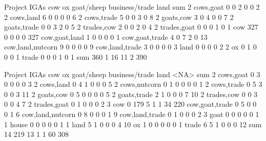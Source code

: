 \begin{Schunk}
\begin{Soutput}
                  Project
IGAs               cow  ox goat/sheep business/trade land sum
  2 cows,goat        0   0          2              0    0   2
  2 cows,land        6   0          0              0    0   6
  2 cows,trade       5   0          0              3    0   8
  2 goats,cow        3   0          4              0    0   7
  2 goats,trade      0   0          3              2    0   5
  2 trades,cow       2   0          0              2    0   4
  2 trades,goat      0   0          0              1    0   1
  cow              327   0          0              0    0 327
  cow,goat,land      1   0          0              0    0   1
  cow,goat,trade     4   0          7              2    0  13
  cow,land,nutcorn   9   0          0              0    0   9
  cow,land,trade     3   0          0              0    0   3
  land               0   0          0              0    2   2
  ox                 0   1          0              0    0   1
  trade              0   0          0              1    0   1
  sum              360   1         16             11    2 390
\end{Soutput}
\begin{Soutput}
                  Project
IGAs               cow  ox goat/sheep business/trade land <NA> sum
  2 cows,goat        0   3          0              0    0    0   3
  2 cows,land        0   4          1              0    0    0   5
  2 cows,nutcorn     0   1          0              0    0    0   1
  2 cows,trade       0   5          3              0    0    3  11
  2 goats,cow        0   5          0              0    0    0   5
  2 goats,trade      2   1          0              0    0    7  10
  2 trades,cow       0   0          3              0    0    4   7
  2 trades,goat      0   1          0              0    0    2   3
  cow                0 179          5              1    1   34 220
  cow,goat,trade     0   5          0              0    0    1   6
  cow,land,nutcorn   0   8          0              0    0    1   9
  cow,land,trade     0   1          0              0    0    2   3
  goat               0   0          0              0    0    1   1
  house              0   0          0              0    0    1   1
  land               5   1          0              0    0    4  10
  ox                 1   0          0              0    0    0   1
  trade              6   5          1              0    0    0  12
  sum               14 219         13              1    1   60 308

\end{Soutput}
\end{Schunk}
